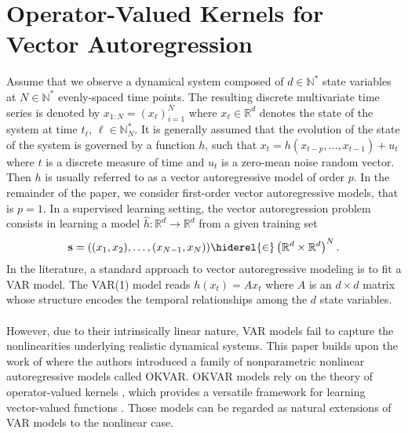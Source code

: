 \section{Operator-Valued Kernels for Vector Autoregression}
Assume that we observe a dynamical system composed of $d\in\mathbb{N}^*$ state
variables at $N\in\mathbb{N}^*$ evenly-spaced time points. The resulting
discrete multivariate time series is denoted by $x_{1:N}=(x_\ell)_{i=1}^N$
where $x_\ell\in\mathbb{R}^d$ denotes the state of the system at time
$t_\ell$, $\ell\in\mathbb{N}_N^*$. It is generally assumed that the evolution
of the state of the system is governed by a function $h$, such that
$x_{t}=h(x_{t-p},\dots,x_{t-1}) + u_{t}$ where $t$ is a discrete
measure of time and $u_t$ is a zero-mean noise random vector. %
Then $h$ is usually referred to as a vector autoregressive model of order $p$.
In the remainder of the paper, we consider first-order vector autoregressive
models, that is $p=1$. In a supervised learning setting, the vector
autoregression problem consists in learning a model $\hat{h}:\mathbb{R}^d \to
\mathbb{R}^d$ from a given training set 
\begin{dmath*}
    \seq{s} = ((x_{1},x_{2}),\dots,(x_{N-1},x_{N}))\hiderel{\in}
    \left(\mathbb{R}^d\times\mathbb{R}^d\right)^N.
\end{dmath*}
In the literature, a standard approach to vector autoregressive modeling is to
fit a \ac{VAR} model. The \ac{VAR}(1) model reads $h(x_t) = Ax_t$ where $A$
is an $d\times d$ matrix whose structure encodes the temporal relationships
among the $d$ state variables.
\paragraph{}
However, due to their intrinsically linear nature, \acs{VAR} models fail to
capture the nonlinearities underlying realistic dynamical systems. This paper
builds upon the work of \citet{Lim2015} where the authors introduced a
family of nonparametric nonlinear autoregressive models called \ac{OKVAR}.
\ac{OKVAR} models rely on the theory of operator-valued kernels
\cite{Pedrick57, Senkene73}, which provides a versatile framework for learning
vector-valued functions \citep{Micchelli2005,Carmeli2010,Alvarez2012}. Those
models can be regarded as natural extensions of VAR models to the nonlinear
case.
